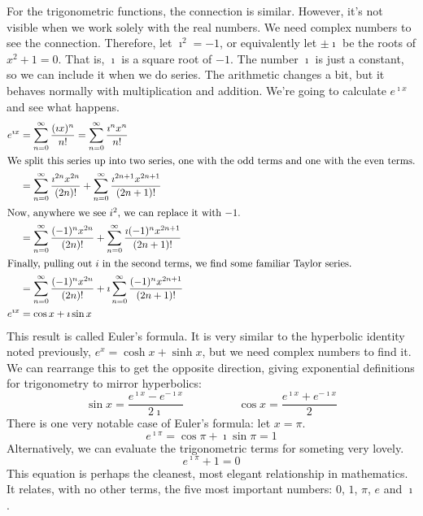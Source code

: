 \documentclass[fleqn,letterpaper]{report}
\begin{document}
For the trigonometric functions, the connection is similar.
However, it's not visible when we work solely with the real
numbers. We need complex numbers to see the connection.
Therefore, let $\imath^2 = -1$, or equivalently let $\pm
\imath$ be the roots of $x^2 + 1 = 0$. That is, $\imath$ is a
square root of $-1$. The number $\imath$ is just a constant,
so we can include it when we do series. The arithmetic changes
a bit, but it behaves normally with multiplication and
addition. We're going to calculate $e^{\imath x}$ and see
what happens.
\begin{align*}
e^{\imath x} & = \sum_{n=0}^\infty \frac{(\imath x)^n}{n!} 
= \sum_{n=0}^\infty \frac{\imath^n x^n}{n!} \\
\intertext{We split this series up into two series, one with
the odd terms and one with the even terms.}
& = \sum_{n=0}^\infty \frac{\imath^{2n} x^{2n}}{(2n)!} 
+ \sum_{n=0}^\infty \frac{\imath^{2n+1} x^{2n+1}}{(2n+1)!} \\
\intertext{Now, anywhere we see $i^2$, we can replace it with
$-1$.}
& = \sum_{n=0}^\infty \frac{(-1)^n x^{2n}}{(2n)!} 
+ \sum_{n=0}^\infty \frac{\imath (-1)^n x^{2n+1}}{(2n+1)!} \\
\intertext{Finally, pulling out $i$ in the second terms, we
find some familiar Taylor series.}
& = \sum_{n=0}^\infty \frac{(-1)^n x^{2n}}{(2n)!} 
+ \imath \sum_{n=0}^\infty \frac{(-1)^n x^{2n+1}}{(2n+1)!} \\
e^{\imath x} & = \cos x + \imath \sin x 
\end{align*}
This result is called Euler's formula. It is very similar to
the hyperbolic identity noted previously, $e^x = \cosh x +
\sinh x$, but we need complex numbers to find it. We can
rearrange this to get the opposite direction, giving
exponential definitions for trigonometry to mirror
hyperbolics:
\begin{equation*}
\sin x = \frac{e^{\imath x} - e^{-\imath x}}{2\imath}
\hspace{2cm}
\cos x = \frac{e^{\imath x} + e^{-\imath x}}{2}
\end{equation*}
There is one very notable case of Euler's formula: let $x = \pi$. 
\begin{equation*}
e^{\imath \pi} = \cos \pi + \imath \sin \pi = 1
\end{equation*}
Alternatively, we can evaluate the trigonometric terms for
someting very lovely. 
\begin{equation*}
e^{\imath \pi} + 1 = 0
\end{equation*}
This equation is perhaps the cleanest, most elegant
relationship in mathematics. It relates, with no other terms,
the five most important numbers: $0$, $1$, $\pi$, $e$ and
$\imath$.
\end{document}
